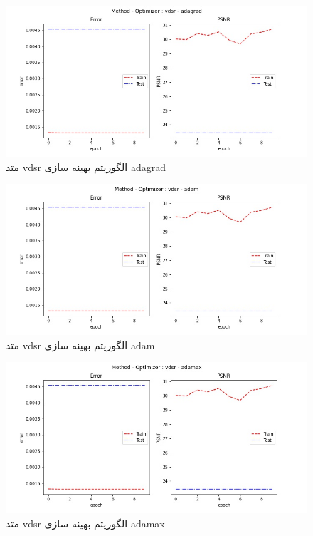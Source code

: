  \begin{figure}[!h] 
       \centering 
       \includegraphics[width=160mm]{./chapter3/images/error-psnr-vdsr-adagrad.jpg}
       \caption{متد vdsr الگوریتم بهینه سازی adagrad}
       \label{fig:error-psnr-vdsr-adagrad}
 \end{figure}
 \begin{figure}[!h] 
       \centering 
       \includegraphics[width=160mm]{./chapter3/images/error-psnr-vdsr-adam.jpg}
       \caption{متد vdsr الگوریتم بهینه سازی adam}
       \label{fig:error-psnr-vdsr-adam}
 \end{figure}
 \begin{figure}[!h] 
       \centering 
       \includegraphics[width=160mm]{./chapter3/images/error-psnr-vdsr-adamax.jpg}
       \caption{متد vdsr الگوریتم بهینه سازی adamax}
       \label{fig:error-psnr-vdsr-adamax}
 \end{figure}

